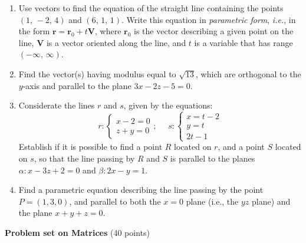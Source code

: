 \documentclass[fleqn]{article}
\begin{document}
\begin{enumerate}
  \item Use vectors to find the equation of the straight line containing the points $\left( 1,\,-2,\,4\right) $ and $\left( 6,\,1,\,1\right) .$ Write this equation in \emph{parametric form}, {\it i.e.}, in the form $\mathbf{r}= \mathbf{r}_{0}+t\mathbf{V}$, where $\mathbf{r}_{0}$ is the vector describing a given point on the line, $\mathbf{V}$ is a vector oriented along the line, and $t$ is a variable that has range $\left( -\infty ,\,\infty \right)$. 
  
  \item Find the vector(s) having modulus equal to $\sqrt{13}$, which are orthogonal to the $y$-axis and parallel to the plane $3x - 2z -5=0$.
  
  \item Considerate the lines $r$ and $s$, given by the  equations: 
  \begin{equation}
  r: 
  \begin{cases} x-2= 0 \\ z+y=0    \end{cases} ; ~~~~~~   s: \begin{cases} x = t - 2  \\ y=t \\ 2t- 1   \end{cases}   
  \end{equation}
  Establish if it is possible to find a point $R$ located on $r$, and a point $S$ located on $s$, so that the line passing by $R$ and $S$ 
  is parallel to the planes 
  $\alpha : x - 3z + 2 = 0$ and  $\beta : 2x - y = 1$.
  
  \item 
  
  Find a parametric equation describing the line passing by the point $P = (1, 3, 0)$, and parallel to both the $x=0$ plane (i.e., the $yz$ plane) and the plane $x + y + z = 0$. 
  
  \end{enumerate}

\pagebreak

\textbf{Problem set on Matrices} (40 points)
\end{document}
